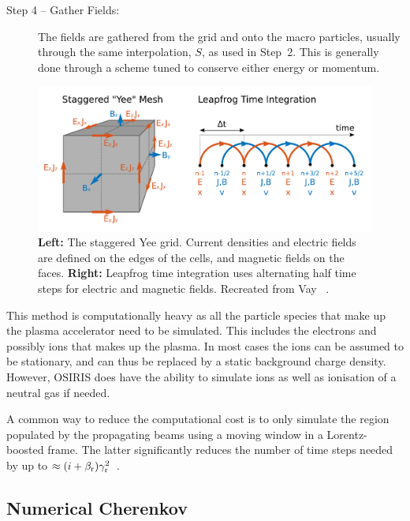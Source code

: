 \begin{description}
    \item[Step 4 -- Gather Fields:] The fields are gathered from the grid and onto the macro particles, usually through the same interpolation, $S$, as used in Step~2.
    This is generally done through a scheme tuned to conserve either energy or momentum.
\end{description}

\begin{figure}[hbt]
    \centering
    \includegraphics[width=0.75\linewidth]{figures/EMFSolver}
    \caption{\label{Fig:PIC:EMF}
        \textbf{Left:} The staggered Yee grid. Current densities and electric fields are defined on the edges of the cells, and magnetic fields on the faces.
        \textbf{Right:} Leapfrog time integration uses alternating half time steps for electric and magnetic fields.
        Recreated from Vay \etal~\cite{vay:2016}.
    }
\end{figure}

This method is computationally heavy as all the particle species that make up the plasma accelerator need to be simulated.
This includes the electrons and possibly ions that makes up the plasma.
In most cases the ions can be assumed to be stationary, and can thus be replaced by a static background charge density.
However, OSIRIS does have the ability to simulate ions as well as ionisation of a neutral gas if needed.

A common way to reduce the computational cost is to only simulate the region populated by the propagating beams using a moving window in a Lorentz-boosted frame.
The latter significantly reduces the number of time steps needed by up to $\approx (i+\beta_{\mathrm{r}})\gamma_{\mathrm{r}}^2$~\cite{vay:2011}.

\subsection{Numerical Cherenkov}
\label{PIC:NumCher}

